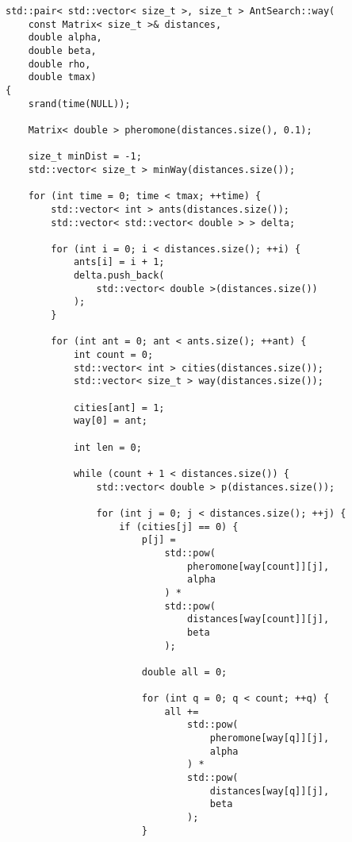 \begin{lstlisting}[caption=Муравьиный алгоритм,label=lst:ant]
std::pair< std::vector< size_t >, size_t > AntSearch::way(
    const Matrix< size_t >& distances,
    double alpha,
    double beta,
    double rho,
    double tmax)
{
    srand(time(NULL));

    Matrix< double > pheromone(distances.size(), 0.1);

    size_t minDist = -1;
    std::vector< size_t > minWay(distances.size());

    for (int time = 0; time < tmax; ++time) {
        std::vector< int > ants(distances.size());
        std::vector< std::vector< double > > delta;

        for (int i = 0; i < distances.size(); ++i) {
            ants[i] = i + 1;
            delta.push_back(
                std::vector< double >(distances.size())
            );
        }

        for (int ant = 0; ant < ants.size(); ++ant) {
            int count = 0;
            std::vector< int > cities(distances.size());
            std::vector< size_t > way(distances.size());

            cities[ant] = 1;
            way[0] = ant;

            int len = 0;

            while (count + 1 < distances.size()) {
                std::vector< double > p(distances.size());

                for (int j = 0; j < distances.size(); ++j) {
                    if (cities[j] == 0) {
                        p[j] =
                            std::pow(
                                pheromone[way[count]][j],
                                alpha
                            ) *
                            std::pow(
                                distances[way[count]][j],
                                beta
                            );

                        double all = 0;

                        for (int q = 0; q < count; ++q) {
                            all +=
                                std::pow(
                                    pheromone[way[q]][j],
                                    alpha
                                ) *
                                std::pow(
                                    distances[way[q]][j],
                                    beta
                                );
                        }


\end{lstlisting}
